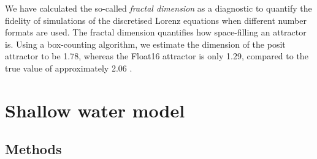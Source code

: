 \documentclass[draft]{agujournal2019}
\begin{document}
We have calculated the so-called \emph{fractal dimension} as a diagnostic to quantify the fidelity of simulations of the discretised Lorenz equations when different number formats are used. The fractal dimension quantifies how space-filling an attractor is. Using a box-counting algorithm, we estimate the dimension of the posit attractor to be 1.78, whereas the Float16 attractor is only 1.29, compared to the true value of approximately 2.06 \cite{Grassberger1983,McGuinness1983}. 


\section{Shallow water model}
\label{sec:swm}

\subsection{Methods}
\label{sec:swm_methods}
\end{document}
